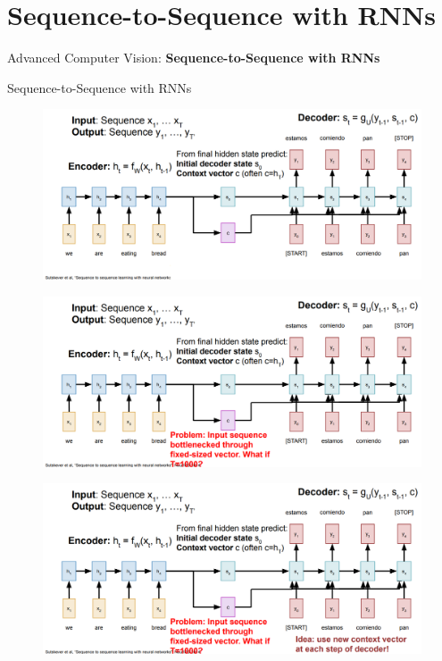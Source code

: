 \section{Sequence-to-Sequence with RNNs}
\begin{frame}{}
    \LARGE Advanced Computer Vision: \textbf{Sequence-to-Sequence with RNNs}
\end{frame}

\begin{frame}[allowframebreaks]{Sequence-to-Sequence with RNNs}
    \begin{figure}
    \centering
    \includegraphics[width=1.0\textwidth,height=1.0\textheight,keepaspectratio]{images/advanced-cv/rnn_5.png}
    \end{figure}  
\framebreak
    \begin{figure}
    \centering
    \includegraphics[width=1.0\textwidth,height=1.0\textheight,keepaspectratio]{images/advanced-cv/rnn_6.png}
    \end{figure}  
\framebreak
    \begin{figure}
    \centering
    \includegraphics[width=1.0\textwidth,height=1.0\textheight,keepaspectratio]{images/advanced-cv/rnn_7.png}
    \end{figure}     
\end{frame}

